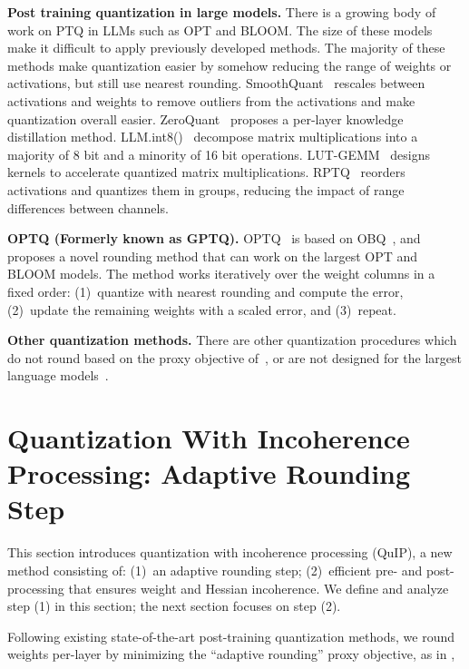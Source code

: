 \textbf{Post training quantization in large models.} There is a growing body of work on PTQ in LLMs such as OPT and BLOOM. The size of these models make it difficult to apply previously developed methods. The majority of these methods make quantization easier by somehow reducing the range of weights or activations, but still use nearest rounding. SmoothQuant~\citep{xiao2023smooth} rescales between activations and weights to remove outliers from the activations and make quantization overall easier. ZeroQuant~\citep{yao2022zero} proposes a per-layer knowledge distillation method. LLM.int8()~\citep{dettmers2022int8} decompose matrix multiplications into a majority of 8 bit and a minority of 16 bit operations. LUT-GEMM~\citep{park2023lutgemm} designs kernels to accelerate quantized matrix multiplications. RPTQ~\citep{yuan2023rptq} reorders activations and quantizes them in groups, reducing the impact of range differences between channels.

\textbf{OPTQ (Formerly known as GPTQ).} OPTQ~\citep{frantar2023gptq} is based on OBQ~\citep{frantar2022obc}, and proposes a novel rounding method that can work on the largest OPT and BLOOM models. The method works iteratively over the weight columns in a fixed order: (1)~quantize with nearest rounding and compute the error, (2)~update the remaining weights with a scaled error, and (3)~repeat.

\textbf{Other quantization methods.} There are other quantization procedures which do not round based on the proxy objective of~\cite{nagel2020up}, or are not designed for the largest language models~\citep{jeon2022biq,li2022qvit,liu2023noisy,nagel2019dfq,wang2020bit,wei2022outlier}.

\section{Quantization With Incoherence Processing: Adaptive Rounding Step }
\label{secQuIPquant}

This section introduces quantization with incoherence processing (QuIP), a new method consisting of: (1)~an adaptive rounding step; (2)~efficient pre- and post-processing that ensures weight and Hessian incoherence. We define and analyze step (1) in this section; the next section focuses on step (2).

Following existing state-of-the-art post-training quantization methods, we round weights per-layer by minimizing the ``adaptive rounding'' proxy objective, as in \citet{nagel2020up},

